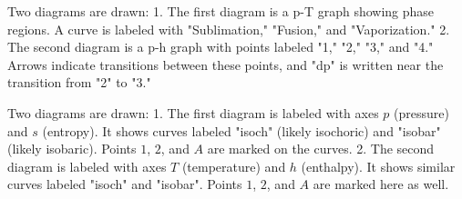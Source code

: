Two diagrams are drawn:  
1. The first diagram is a p-T graph showing phase regions. A curve is labeled with "Sublimation," "Fusion," and "Vaporization."  
2. The second diagram is a p-h graph with points labeled "1," "2," "3," and "4." Arrows indicate transitions between these points, and "dp" is written near the transition from "2" to "3."

Two diagrams are drawn:  
1. The first diagram is labeled with axes \( p \) (pressure) and \( s \) (entropy). It shows curves labeled "isoch" (likely isochoric) and "isobar" (likely isobaric). Points \( 1 \), \( 2 \), and \( A \) are marked on the curves.  
2. The second diagram is labeled with axes \( T \) (temperature) and \( h \) (enthalpy). It shows similar curves labeled "isoch" and "isobar". Points \( 1 \), \( 2 \), and \( A \) are marked here as well.